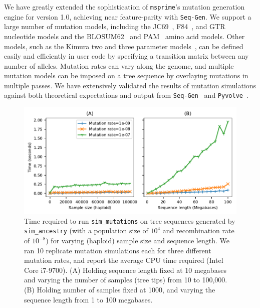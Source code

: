 \documentclass[9pt,twocolumn,twoside,lineno]{gsajnl}
\newcommand{\msprime}[0]{\texttt{msprime}}
\newcommand{\SeqGen}[0]{\texttt{Seq-Gen}}
\newcommand{\Pyvolve}[0]{\texttt{Pyvolve}}
\begin{document}
We have greatly extended the sophistication of
\msprime's mutation generation engine for version 1.0,
achieving near feature-parity with \SeqGen.
We support a large number of mutation models, including the
JC69~\citep{jukes1969evolution},
F84~\citep{felsenstein1996hidden},
and GTR~\citep{tavare1986some} nucleotide models
and the BLOSUM62~\citep{henikoff1992amino}
and PAM~\citep{dayhoff1978} amino acid models.
Other models, such as the Kimura two and three
parameter models~\citep{kimura1980simple,kimura1981estimation},
can be defined easily and efficiently in
user code by specifying a transition matrix between
any number of alleles.
Mutation rates can vary along the genome, and multiple mutation
models can be imposed on a tree sequence by overlaying mutations
in multiple passes.
We have extensively validated the results of mutation simulations
against both theoretical expectations and output from
\SeqGen~\citep{rambaut1997seq} and
\Pyvolve~\citep{spielman2015pyvolve}.

\begin{figure}
    \includegraphics{figures/mutations-perf}
\caption{\label{fig-mutations-perf} Time required to run
\texttt{sim\_mutations} on tree sequences generated
by \texttt{sim\_ancestry} (with a population size of $10^4$
and recombination rate of $10^{-8}$) for varying (haploid) sample
size and sequence length. We ran 10 replicate mutation simulations
each for three different mutation rates, and report the average
CPU time required (Intel Core i7-9700).
(A) Holding sequence length fixed at 10 megabases and varying the
number of samples (tree tips) from 10 to 100,000.
(B) Holding number of samples fixed at 1000, and varying the sequence
length from 1 to 100 megabases.
\the\columnwidth}
\end{figure}
\end{document}
